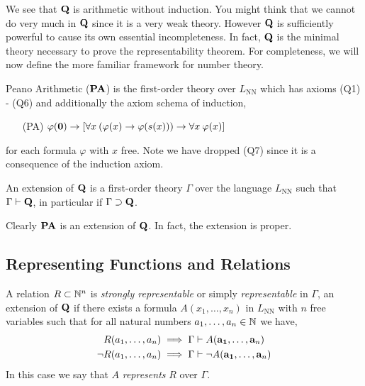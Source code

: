 \documentclass[12pt]{article}
\newcommand{\uq}[1]{\forall{#1} \:}
\begin{document}
\begin{remark}
We see that $\bf{Q}$ is arithmetic without induction. You might think that we cannot do very much in $\bf{Q}$ since it is a very weak theory. However $\bf{Q}$ is sufficiently powerful to cause its own essential incompleteness. In fact, $\bf{Q}$ is the minimal theory necessary to prove the representability theorem. For completeness, we will now define the more familiar framework for number theory.
\end{remark}

\begin{definition}
Peano Arithmetic ($\bf{PA}$) is the first-order theory over $L_{\text{NN}}$ which has axioms (Q1) - (Q6) and additionally the axiom schema of induction,
\begin{enumerate}
\item[(PA)] $\varphi(\bf{0}) \to [\uq{x} (\varphi(x) \to \varphi(s(x))) \to \uq{x} \varphi(x)]$
\end{enumerate}
for each formula $\varphi$ with $x$ free. Note we have dropped (Q7) since it is a consequence of the induction axiom. 
\end{definition}

\begin{definition}
An extension of $\bf{Q}$ is a first-order theory $\Gamma$ over the language $L_{\text{NN}}$ such that $\Gamma \proves \bf{Q}$, in particular if $\Gamma \supset \bf{Q}$. 
\end{definition}

\begin{remark}
Clearly $\bf{PA}$ is an extension of $\bf{Q}$. In fact, the extension is proper.
\end{remark}

\subsection{Representing Functions and Relations}

\begin{definition}
A relation $R \subset \N^n$ is \textit{strongly representable} or simply \textit{representable} in $\Gamma$, an extension of $\bf{Q}$ if there exists a formula $A(x_1, \dots, x_n)$ in $L_{\text{NN}}$ with $n$ free variables such that for all natural numbers $a_1, \dots, a_n \in \N$ we have,
\begin{align*}
R(a_1, \dots, a_n) & \implies \Gamma \proves A(\bf{a_1}, \dots, \bf{a}_n)
\\
\neg R(a_1, \dots, a_n) & \implies \Gamma \proves \neg A(\bf{a_1}, \dots, \bf{a}_n)
\end{align*}
In this case we say that $A$ \textit{represents} $R$ over $\Gamma$.
\end{definition}
\end{document}
